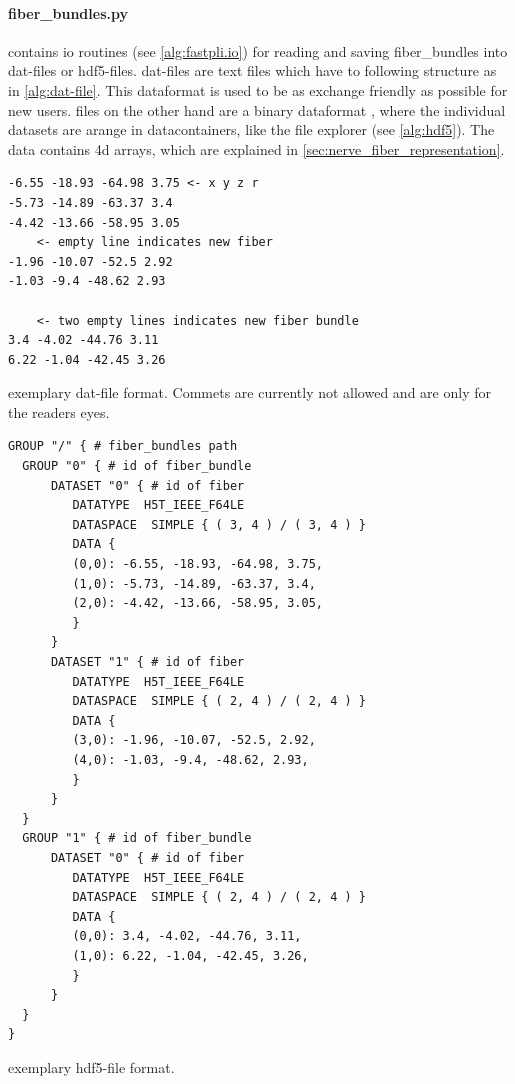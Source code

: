 \paragraph{fiber\_bundles.py} contains io routines (see \cref{alg:fastpli.io}) for reading and saving fiber\_bundles into dat-files or hdf5-files. dat-files are text files which have to following structure as in \cref{alg:dat-file}. This dataformat is used to be as exchange friendly as possible for new users. \hdf{} files on the other hand are a binary dataformat \cite{hdf5}, where the individual datasets are arange in datacontainers, like the file explorer (see \cref{alg:hdf5}). The data contains 4d arrays, which are explained in \cref{sec:nerve_fiber_representation}.
% 
\begin{lstfloat}[!ht]
\begin{lstlisting}
-6.55 -18.93 -64.98 3.75 <- x y z r
-5.73 -14.89 -63.37 3.4
-4.42 -13.66 -58.95 3.05
    <- empty line indicates new fiber
-1.96 -10.07 -52.5 2.92
-1.03 -9.4 -48.62 2.93

    <- two empty lines indicates new fiber bundle
3.4 -4.02 -44.76 3.11
6.22 -1.04 -42.45 3.26
\end{lstlisting}
\caption{exemplary dat-file format. Commets are currently not allowed and are only for the readers eyes.}\label{alg:dat-file}
\end{lstfloat}
% 
\begin{lstfloat}[!ht]
\lstset{style=common}
\begin{lstlisting}
GROUP "/" { # fiber_bundles path
  GROUP "0" { # id of fiber_bundle
      DATASET "0" { # id of fiber
         DATATYPE  H5T_IEEE_F64LE
         DATASPACE  SIMPLE { ( 3, 4 ) / ( 3, 4 ) }
         DATA {
         (0,0): -6.55, -18.93, -64.98, 3.75,
         (1,0): -5.73, -14.89, -63.37, 3.4,
         (2,0): -4.42, -13.66, -58.95, 3.05,
         }
      }
      DATASET "1" { # id of fiber
         DATATYPE  H5T_IEEE_F64LE
         DATASPACE  SIMPLE { ( 2, 4 ) / ( 2, 4 ) }
         DATA {
         (3,0): -1.96, -10.07, -52.5, 2.92,
         (4,0): -1.03, -9.4, -48.62, 2.93,
         }
      }
  }
  GROUP "1" { # id of fiber_bundle
      DATASET "0" { # id of fiber
         DATATYPE  H5T_IEEE_F64LE
         DATASPACE  SIMPLE { ( 2, 4 ) / ( 2, 4 ) }
         DATA {
         (0,0): 3.4, -4.02, -44.76, 3.11,
         (1,0): 6.22, -1.04, -42.45, 3.26,
         }
      }
  }
}
\end{lstlisting}
\caption{exemplary hdf5-file format.} \label{alg:hdf5}
\end{lstfloat}
% 
% 
% 
